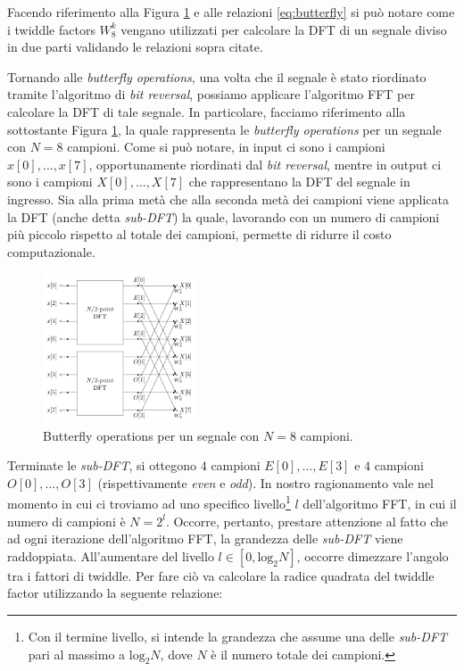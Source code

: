 \documentclass[a4paper,12pt]{report}  %
\begin{document}
Facendo riferimento alla Figura \ref{fig:butterfly} e alle relazioni \eqref{eq:butterfly} si può notare come i twiddle factors $W_8^k$ vengano utilizzati per calcolare la DFT di un segnale diviso in due parti validando le relazioni sopra citate.

Tornando alle \textit{butterfly operations}, una volta che il segnale è stato riordinato tramite l'algoritmo di \textit{bit reversal}, possiamo applicare l'algoritmo FFT per calcolare la DFT di tale segnale.
In particolare, facciamo riferimento alla sottostante Figura \ref{fig:butterfly}, la quale rappresenta le \textit{butterfly operations} per un segnale con $N = 8$ campioni.
Come si può notare, in input ci sono i campioni $x[0], \dots, x[7]$, opportunamente riordinati dal \textit{bit reversal}, mentre in output ci sono i campioni $X[0], \dots, X[7]$ che rappresentano la DFT del segnale in ingresso.
Sia alla prima metà che alla seconda metà dei campioni viene applicata la DFT (anche detta \textit{sub-DFT}) la quale, lavorando con un numero di campioni più piccolo rispetto al totale dei campioni, permette di ridurre il costo computazionale.

\begin{figure}[h]
    \centering
    \includegraphics[width=0.4\textwidth]{imgs/DIT-FFT-butterfly.png}
    \caption{Butterfly operations per un segnale con $N = 8$ campioni.}
    \label{fig:butterfly}
\end{figure}

Terminate le \textit{sub-DFT}, si ottegono $4$ campioni $E[0], \dots, E[3]$ e $4$ campioni $O[0], \dots, O[3]$ (rispettivamente \textit{even} e \textit{odd}).
In nostro ragionamento vale nel momento in cui ci troviamo ad uno specifico livello\footnote{Con il termine livello, si intende la grandezza che assume una delle \textit{sub-DFT} pari al massimo a $\text{log}_2 N$, dove $N$ è il numero totale dei campioni.} $l$ dell'algoritmo FFT, in cui il numero di campioni è $N = 2^l$.
Occorre, pertanto, prestare attenzione al fatto che ad ogni iterazione dell'algoritmo FFT, la grandezza delle \textit{sub-DFT} viene raddoppiata.
All'aumentare del livello $l \in [0, \text{log}_2 N]$, occorre dimezzare l'angolo tra i fattori di twiddle.
Per fare ciò va calcolare la radice quadrata del twiddle factor utilizzando la seguente relazione:
\end{document}
